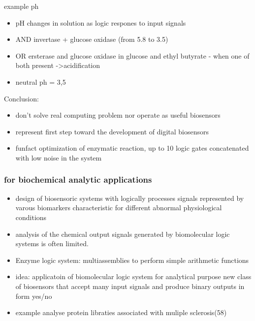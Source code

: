 \documentclass[runningheads]{llncs}
\begin{document}
example ph
\begin{itemize}
	\item pH changes in solution as logic respones to input signals
	\item AND invertase + glucose oxidase (from 5.8 to 3.5)
	\item OR ersterase and glucose oxidase in glucose and ethyl butyrate - when one of both present ->acidification  
	\item neutral ph = 3,5
\end{itemize}
Conclusion: 
\begin{itemize}
	\item don't solve real computing problem  nor operate as useful biosensors 
	\item represent first step toward the development of digital biosensors 
	\item funfact optimization of enzymatic reaction, up to 10 logic gates concatenated with low noise in the system 
\end{itemize}

	\subsubsection{for biochemical analytic applications}
		\begin{itemize}
			\item design of biosensoric systems with logically processes signals represented by varous biomarkers characteristic for different abnormal physiological conditions
			\item analysis of the chemical output signals generated by biomolecular logic systems is often limited.
			\item Enzyme logic system: multiassemblies to perform simple arithmetic functions
			\item idea: applicatoin of biomolecular logic system for analytical purpose new class of biosensors that accept many input signals and produce binary outputs in form yes/no 
			\item example analyse protein libraties associated with muliple sclerosis(58)
		\end{itemize}
\end{document}
